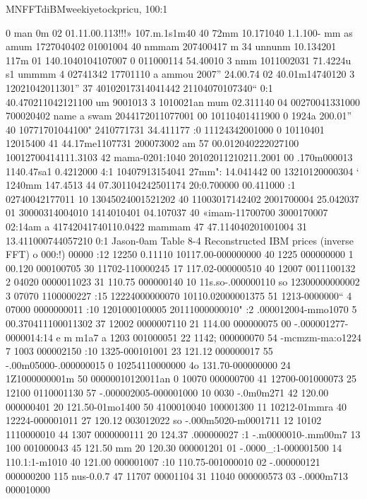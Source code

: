 {{{{ 

MNFFTdiBMweekiyetockpricu, 100:1

 

 

 

 

 

 

 

0 man 0m 02 01.11.00.113!!!» 107.m.1s1m40 40 72mm 10.171040
1.1.100- mm as amum 1727040402 01001004 40 nmmam
207400417 m 34 unnunm 10.134201 117m 01 140.1040104107007
0 011000114 54.40010 3 nmm 1011002031 71.4224u s1 ummmm
4 02741342 17701110 a ammou 2007” 24.00.74 02 40.01m14740120
3 12021042011301” 37 40102017314041442 21104070107340“ 0:1 40.470211042121100
um 9001013 3 1010021an mum 02.311140 04 00270041331000
700020402 name a swam 2044172011077001 00 10110401411900
0 1924a 200.01” 40 10771701044100" 2410771731 34.411177 :0 11124342001000
0 10110401 12015400 41 44.17me1107731 200073002 am 57 00.012040222027100
10012700414111.3103 42 mama-0201:1040 20102011210211.2001 00 .170m000013
1140.47sa1 0.4212000 4:1 10407913154041 27mm": 14.041442 00 13210120000304
‘ 1240mm 147.4513 44 07.301104242501174 20:0.700000 00.411000 :1 02740042177011 10
13045024001521202 40 11003017142402 2001700004 25.042037 01 30000314004010
1414010401 04.107037 40 «imam-11700700 3000170007 02:14am a 41742041740110.0422
mammam 47 47.114040201001004 31 13.411000744057210 0:1 Jason-0am
Table 8-4 Reconstructed IBM prices (inverse FFT)
o 000:!) 00000 :12 12250 0.11110 10117.00-000000000 40 1225 000000000
1 00.120 000100705 30 11702-110000245 17 117.02-000000510 40 12007 0011100132
2 04020 0000011023 31 110.75 000000140 10 11s.so-.000000110 so 12300000000002
3 07070 1100000227 :15 12224000000070 10110.02000001375 51 1213-0000000“
4 07000 0000000011 :10 1201000100005 20111000000010" :2 .000012004-mmo1070
5 00.370411100011302 37 12002 0000007110 21 114.00 000000075 00 -.000001277-0000014:14
e m m1a7 a 1203 001000051 22 1142; 000000070 54 -mcmzm-ma:o1224
7 1003 000002150 :10 1325-000101001 23 121.12 000000017 55 -.00m05000-.000000015
0 10254110000000 4o 131.70-000000000 24 1Z1000000001m 50 00000010120011an
0 10070 000000700 41 12700-001000073 25 12100 0110001130 57 -.000002005-000001000
10 0030 -.0m0m271 42 120.00 000000401 20 121.50-01mo1400 50 4100010040 100001300
11 10212-01mmra 40 12224-000001011 27 120.12 003012022 so -.000m5020-m0001711
12 10102 1110000010 44 1307 0000000111 20 124.37 .000000027 :1 -.m0000010-.mm00m7
13 100 001000043 45 121.50 mm 20 120.30 000001201 01 -.0000_:1-000001500
14 110.1:1-m1010 40 121.00 000001007 :10 110.75-001000010 02 -.000000121 000000200
115 nus-0.0.7 47 11707 00001104 31 11040 000000573 03 -.0000m713 000010000

}}}}
